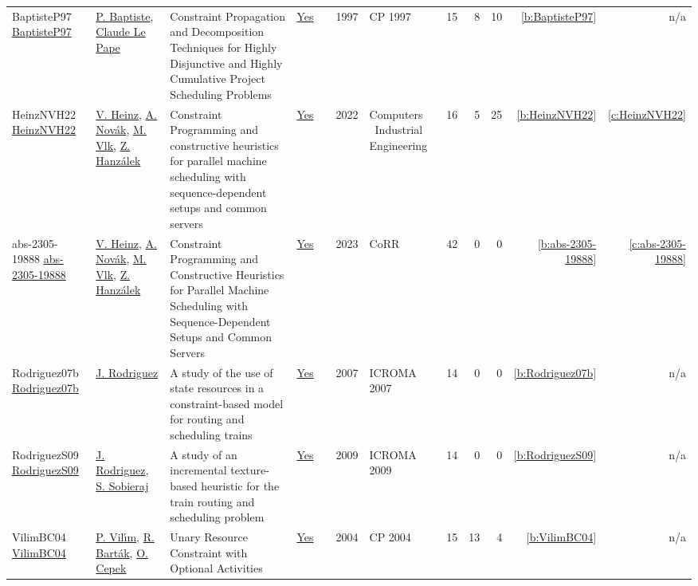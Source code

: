 {\begin{longtable}{>{\raggedright\arraybackslash}p{3cm}>{\raggedright\arraybackslash}p{6cm}>{\raggedright\arraybackslash}p{6.5cm}rrrp{2.5cm}rrrrr}
BaptisteP97 \href{https://doi.org/10.1007/BFb0017454}{BaptisteP97} & \hyperref[auth:a163]{P. Baptiste}, \hyperref[auth:a164]{Claude Le Pape} & Constraint Propagation and Decomposition Techniques for Highly Disjunctive and Highly Cumulative Project Scheduling Problems & \href{../works/BaptisteP97.pdf}{Yes} & \cite{BaptisteP97} & 1997 & CP 1997 & 15 & 8 & 10 & \ref{b:BaptisteP97} & n/a\\
HeinzNVH22 \href{https://doi.org/10.1016/j.cie.2022.108586}{HeinzNVH22} & \hyperref[auth:a436]{V. Heinz}, \hyperref[auth:a437]{A. Nov{\'{a}}k}, \hyperref[auth:a313]{M. Vlk}, \hyperref[auth:a116]{Z. Hanz{\'{a}}lek} & Constraint Programming and constructive heuristics for parallel machine scheduling with sequence-dependent setups and common servers & \href{../works/HeinzNVH22.pdf}{Yes} & \cite{HeinzNVH22} & 2022 & Computers \  Industrial Engineering & 16 & 5 & 25 & \ref{b:HeinzNVH22} & \ref{c:HeinzNVH22}\\
abs-2305-19888 \href{https://doi.org/10.48550/arXiv.2305.19888}{abs-2305-19888} & \hyperref[auth:a436]{V. Heinz}, \hyperref[auth:a437]{A. Nov{\'{a}}k}, \hyperref[auth:a313]{M. Vlk}, \hyperref[auth:a116]{Z. Hanz{\'{a}}lek} & Constraint Programming and Constructive Heuristics for Parallel Machine Scheduling with Sequence-Dependent Setups and Common Servers & \href{../works/abs-2305-19888.pdf}{Yes} & \cite{abs-2305-19888} & 2023 & CoRR & 42 & 0 & 0 & \ref{b:abs-2305-19888} & \ref{c:abs-2305-19888}\\
Rodriguez07b \href{}{Rodriguez07b} & \hyperref[auth:a784]{J. Rodriguez} & A study of the use of state resources in a constraint-based model for routing and scheduling trains & \href{../works/Rodriguez07b.pdf}{Yes} & \cite{Rodriguez07b} & 2007 & ICROMA 2007 & 14 & 0 & 0 & \ref{b:Rodriguez07b} & n/a\\
RodriguezS09 \href{}{RodriguezS09} & \hyperref[auth:a784]{J. Rodriguez}, \hyperref[auth:a1027]{S. Sobieraj} & A study of an incremental texture-based heuristic for the train routing and scheduling problem & \href{../works/RodriguezS09.pdf}{Yes} & \cite{RodriguezS09} & 2009 & ICROMA 2009 & 14 & 0 & 0 & \ref{b:RodriguezS09} & n/a\\
VilimBC04 \href{https://doi.org/10.1007/978-3-540-30201-8_8}{VilimBC04} & \hyperref[auth:a121]{P. Vil{\'{\i}}m}, \hyperref[auth:a153]{R. Bart{\'{a}}k}, \hyperref[auth:a162]{O. Cepek} & Unary Resource Constraint with Optional Activities & \href{../works/VilimBC04.pdf}{Yes} & \cite{VilimBC04} & 2004 & CP 2004 & 15 & 13 & 4 & \ref{b:VilimBC04} & n/a\\

\end{longtable}}
